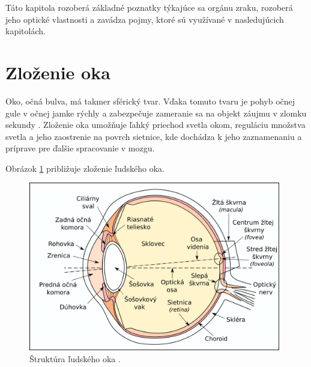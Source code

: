 Táto kapitola rozoberá základné poznatky týkajúce sa orgánu zraku, rozoberá jeho optické vlastnosti a zavádza pojmy, ktoré sú využívané v nasledujúcich kapitolách.

\section{Zloženie oka}\label{sec:oko}
Oko, očná bulva, má takmer sférický tvar. Vďaka tomuto tvaru je pohyb očnej gule v očnej jamke rýchly a zabezpečuje zameranie sa na objekt záujmu v zlomku sekundy \cite{vlast_oka}. Zloženie oka umožňuje ľahký priechod svetla okom, reguláciu množstva svetla a jeho zaostrenie na povrch sietnice, kde dochádza k jeho zaznamenaniu a príprave pre ďalšie spracovanie v mozgu.

Obrázok \ref{fig:oko} približuje zloženie ľudského oka.

\begin{figure}[h]
  \centering
  \includegraphics[width=11cm]{img/Eyesection.png}
  \caption{Štruktúra ľudského oka \cite{zloz_oka}.}
  \label{fig:oko}
\end{figure}

